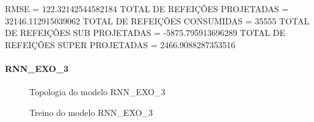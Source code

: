 \documentclass[	12pt, Times, openright, twoside, a4paper, english, brazil]{abntex2}
\begin{document}
                RMSE = 122.32142544582184\newline
                TOTAL DE REFEIÇÕES PROJETADAS = 32146.112915039062\newline
                TOTAL DE REFEIÇÕES CONSUMIDAS = 35555\newline
                TOTAL DE REFEIÇÕES SUB PROJETADAS = -5875.795913696289\newline
                TOTAL DE REFEIÇÕES SUPER PROJETADAS = 2466.9088287353516\newline

              \paragraph{RNN\_EXO\_3}
                \begin{figure}[!ht]
                  \caption{Topologia do modelo RNN\_EXO\_3 \label{fig:case1_rnn_exo_3} }
                \end{figure}

                \begin{figure}[!ht]
                  \caption{Treino do modelo RNN\_EXO\_3 \label{fig:case1_rnn_exo_3_train} }
                \end{figure}
\end{document}
